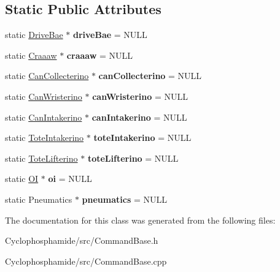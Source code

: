 \subsection*{Static Public Attributes}
\begin{DoxyCompactItemize}
\item 
\hypertarget{class_command_base_aa28ad51d4be3179d9a50932b3232292e}{}static \hyperlink{class_drive_bae}{Drive\+Bae} $\ast$ {\bfseries drive\+Bae} = N\+U\+L\+L\label{class_command_base_aa28ad51d4be3179d9a50932b3232292e}

\item 
\hypertarget{class_command_base_af6de215cde5d61baa455454d6811990e}{}static \hyperlink{class_craaaw}{Craaaw} $\ast$ {\bfseries craaaw} = N\+U\+L\+L\label{class_command_base_af6de215cde5d61baa455454d6811990e}

\item 
\hypertarget{class_command_base_a1d3d0334b1085bc85f88c3ea73777a14}{}static \hyperlink{class_can_collecterino}{Can\+Collecterino} $\ast$ {\bfseries can\+Collecterino} = N\+U\+L\+L\label{class_command_base_a1d3d0334b1085bc85f88c3ea73777a14}

\item 
\hypertarget{class_command_base_ac364637c399a5b4e6db01113ae9a230f}{}static \hyperlink{class_can_wristerino}{Can\+Wristerino} $\ast$ {\bfseries can\+Wristerino} = N\+U\+L\+L\label{class_command_base_ac364637c399a5b4e6db01113ae9a230f}

\item 
\hypertarget{class_command_base_af9fc2f84b79ccdf1200e915a7d5a58aa}{}static \hyperlink{class_can_intakerino}{Can\+Intakerino} $\ast$ {\bfseries can\+Intakerino} = N\+U\+L\+L\label{class_command_base_af9fc2f84b79ccdf1200e915a7d5a58aa}

\item 
\hypertarget{class_command_base_a7afb80d21b6b8376ef0de8e26e9fb049}{}static \hyperlink{class_tote_intakerino}{Tote\+Intakerino} $\ast$ {\bfseries tote\+Intakerino} = N\+U\+L\+L\label{class_command_base_a7afb80d21b6b8376ef0de8e26e9fb049}

\item 
\hypertarget{class_command_base_aa4a4fb0c3dedaa455327bb3e4217f656}{}static \hyperlink{class_tote_lifterino}{Tote\+Lifterino} $\ast$ {\bfseries tote\+Lifterino} = N\+U\+L\+L\label{class_command_base_aa4a4fb0c3dedaa455327bb3e4217f656}

\item 
\hypertarget{class_command_base_ae6807501159925367f8008fc0534eda5}{}static \hyperlink{class_o_i}{O\+I} $\ast$ {\bfseries oi} = N\+U\+L\+L\label{class_command_base_ae6807501159925367f8008fc0534eda5}

\item 
\hypertarget{class_command_base_adb07a4bff4cadca38d0b51603d65eb7e}{}static Pneumatics $\ast$ {\bfseries pneumatics} = N\+U\+L\+L\label{class_command_base_adb07a4bff4cadca38d0b51603d65eb7e}

\end{DoxyCompactItemize}


The documentation for this class was generated from the following files\+:\begin{DoxyCompactItemize}
\item 
Cyclophosphamide/src/Command\+Base.\+h\item 
Cyclophosphamide/src/Command\+Base.\+cpp\end{DoxyCompactItemize}
